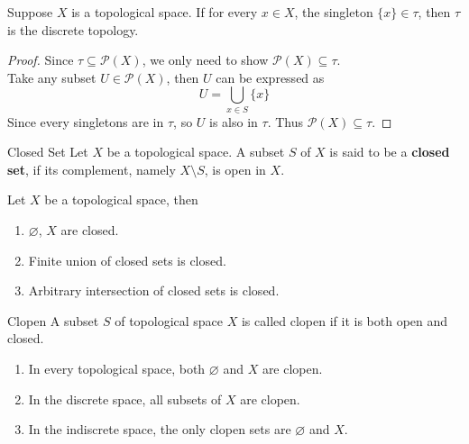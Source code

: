 \begin{proposition}{}{}
    Suppose $X$ is a topological space. If for every $x \in X$, the
    singleton $\{x\} \in \tau$, then $\tau$ is the
    discrete topology.
\end{proposition}

\begin{proof}
    Since $\tau \subseteq \mathcal{P}(X) $, we only need to show
    $\mathcal{P}(X) \subseteq \tau $.\\
    Take any subset $U \in \mathcal{P}(X) $, then $U$ can be expressed as
    \begin{equation*}
        U = \bigcup_{x \in S} \{x\}
    \end{equation*}
    Since every singletons are in $\tau$, so $U$ is also in $\tau$.
    Thus $\mathcal{P}(X) \subseteq \tau$.
\end{proof}

\begin{definition}{Closed Set}{}
    Let $X$ be a topological space. A subset $S$ of $X$ is said to be
    a \textbf{closed set}, if its complement, namely $X \setminus S$,
    is open in $X$.
\end{definition}

\begin{proposition}{}{}
    Let $X$ be a topological space, then
    \begin{enumerate}

        \item $\varnothing$, $X$ are closed.
        \item Finite union of closed sets is closed.
        \item Arbitrary intersection of closed sets is closed.

    \end{enumerate}
\end{proposition}

\begin{definition}{Clopen}{}
    A subset $S$ of topological space $X$ is called clopen if it is
    both open and closed.
\end{definition}

\begin{remarks}
    \begin{enumerate}

        \item In every topological space, both $\varnothing$ and
            $X$ are clopen.
        \item In the discrete space, all subsets of $X$ are clopen.
        \item In the indiscrete space, the only clopen sets are
            $\varnothing$ and $X$.

    \end{enumerate}
\end{remarks}

